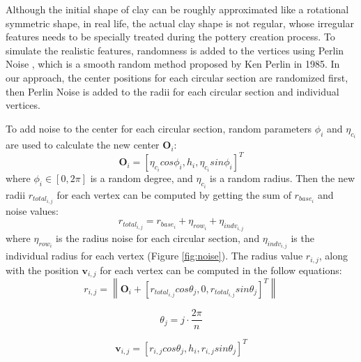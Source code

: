 \documentclass{svjour3}                     %
\begin{document}
Although the initial shape of clay can be roughly approximated like a rotational symmetric shape, in real life, the actual clay shape is not regular, whose irregular features needs to be specially treated during the pottery creation process. To simulate the realistic features, randomness is added to the vertices using Perlin Noise \cite{Perlin1985An}, which is a smooth random method proposed by Ken Perlin in 1985.
In our approach, the center positions for each circular section are randomized first, then Perlin Noise is added to the radii for each circular section and individual vertices.

To add noise to the center for each circular section, random parameters $\phi_{i}$ and $\eta_{c_{i}}$ are used to calculate the new center $\mathbf{O}_{i}$:
\begin{equation}
\label{eqn:oi}
\mathbf{O}_{i} = \left[\eta_{c_{i}}cos\phi_{i}, h_{i}, \eta_{c_{i}}sin\phi_{i}\right]^T
\end{equation}
where $\phi_{i} \in [0, 2\pi]$ is a random degree, and $\eta_{c_{i}}$ is a random radius.
Then the new radii $r_{total_{i,j}}$ for each vertex can be computed by getting the sum of $r_{base_{i}}$ and noise values:
\begin{equation}
r_{total_{i,j}} = r_{base_{i}} + \eta_{row_{i}} + \eta_{indv_{i,j}}
\end{equation}
where $\eta_{row_{i}}$ is the radius noise for each circular section, and $\eta_{indv_{i,j}}$ is the individual radius for each vertex (Figure \ref{fig:noise}). The radius value $r_{i,j}$, along with the position $\mathbf{v}_{i,j}$ for each vertex can be computed in the follow equations:
\begin{equation}
r_{i,j} = \left\|
\mathbf{O}_{i} + \left[ r_{total_{i,j}} cos \theta_{j},
0,
r_{total_{i,j}} sin \theta_{j}
\right]^T
\right\| 
\end{equation}

\begin{equation}
\theta_{j} = j \cdot \frac{2\pi}{n}
\end{equation}

\begin{equation}
\label{eqn:v}
\mathbf{v}_{i,j} =
\left[r_{i,j}  cos \theta_{j},
h_{i},
r_{i,j} sin \theta_{j}\right]^T
\end{equation}
\end{document}
